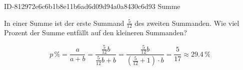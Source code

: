 \begin{exercise}
      {ID-812972e6c6b1b8e11b6ad6d09d94a0a8430c6d93}
      {Summe}
  \ifproblem\problem\par
    In einer Summe ist der erste Summand $\frac{5}{12}$ des zweiten Summanden.
    Wie viel Prozent der Summe entfällt auf den kleineren Summanden?
  \fi
  \ifoutcome\outcome\par
  \begin{equation*}
    p\,\text{\%}
    =\frac{a}{a+b}
    =\frac{\frac{5}{12}b}{\frac{5}{12}b+b}
    =\frac{\frac{5}{12}b}{\left(\frac{5}{12}+1\right)\cdot b}
    =\frac{5}{17}
    \approx\num{29.4}\,\text{\%}
  \end{equation*}
  \fi
\end{exercise}

